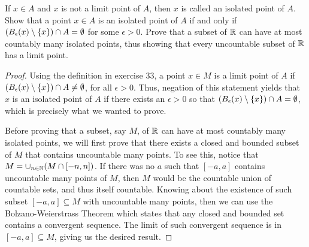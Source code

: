 \begin{exercise}{40}
If $x\in A$ and $x$ is not a limit point of $A$, then $x$ is called an isolated point of $A$. 
Show that a point $x\in A$ is an isolated point of $A$ if and only if $(B_\epsilon(x)\setminus\{x\})\cap A=\emptyset$ for some $\epsilon>0$. 
Prove that a subset of $\mathbb{R}$ can have at most countably many isolated points, thus showing that every uncountable subset of $\mathbb{R}$ has a limit point.
\end{exercise}
\begin{proof}
Using the definition in exercise 33, a point $x\in M$ is a limit point of $A$ if $(B_\epsilon(x)\setminus\{x\})\cap A\neq\emptyset$, for all $\epsilon>0$.
Thus, negation of this statement yields that $x$ is an isolated point of $A$ if there exists an $\epsilon>0$ so that $(B_\epsilon(x)\setminus\{x\})\cap A=\emptyset$, which is precisely what we wanted to prove.

Before proving that a subset, say $M$, of $\mathbb{R}$ can have at most countably many isolated points, we will first prove that there exists a closed and bounded subset of $M$ that contains uncountable many points.
To see this, notice that $M=\cup_{n\in\mathbb{N}} (M\cap [-n,n])$.
If there was no $a$ such that $[-a,a]$ contains uncountable many points of $M$, then $M$ would be the countable union of countable sets, and thus itself countable.
Knowing about the existence of such subset $[-a,a]\subseteq M$ with uncountable many points, then we can use the Bolzano-Weierstrass Theorem which states that any closed and bounded set contains a convergent sequence.
The limit of such convergent sequence is in $[-a,a]\subseteq M$, giving us the desired result.
\end{proof} 


